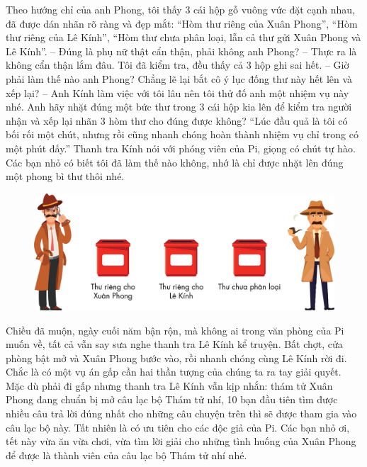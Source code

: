 	\vskip 0.1cm
	Theo hướng chỉ của anh Phong, tôi thấy $3$ cái hộp gỗ vuông vức đặt cạnh nhau, đã được dán nhãn rõ ràng và đẹp mắt: “Hòm thư riêng của Xuân Phong”, “Hòm thư riêng của Lê Kính”, “Hòm thư chưa phân loại, lẫn cả thư gửi Xuân Phong và Lê Kính”. 
	\vskip 0.1cm
	-- Đúng là phụ nữ thật cẩn thận, phải không anh Phong? 
	\vskip 0.1cm
	-- Thực ra là không cẩn thận lắm đâu. Tôi đã kiểm tra, đều thấy cả $3$ hộp ghi sai hết. 
	\vskip 0.1cm
	-- Giờ phải làm thế nào anh Phong? Chẳng lẽ lại bắt cô ý lục đống thư này hết lên và xếp lại? 
	\vskip 0.1cm
	-- Anh Kính làm việc với tôi lâu nên tôi thử đố anh một nhiệm vụ này nhé. Anh hãy nhặt đúng một bức thư trong $3$ cái hộp kia lên để kiểm tra người nhận và xếp lại nhãn $3$ hòm thư cho đúng được không? 
	\vskip 0.1cm
	“Lúc đầu quả là tôi có bối rối một chút, nhưng rồi cũng nhanh chóng hoàn thành nhiệm vụ chỉ trong có một phút đấy.” Thanh tra Kính nói với phóng viên của Pi, giọng có chút tự hào.
	\vskip 0.1cm
	Các bạn nhỏ có biết tôi đã làm thế nào không, nhớ là chỉ được nhặt lên đúng một phong bì thư thôi nhé.
		\begin{figure}[H]
			\centering
			\vspace*{-5pt}
			\captionsetup{labelformat= empty, justification=centering}
			\includegraphics[width=1\linewidth]{5}
			\vspace*{-15pt}
		\end{figure}
	Chiều đã muộn, ngày cuối năm bận rộn, mà không ai trong văn phòng của Pi muốn về, tất cả vẫn say sưa nghe thanh tra Lê Kính kể truyện. Bất chợt, cửa phòng bật mở và Xuân Phong bước vào, rồi nhanh chóng cùng Lê Kính rời đi. Chắc là có một vụ án gấp cần hai thần tượng của chúng ta ra tay giải quyết. Mặc dù phải đi gấp nhưng thanh tra Lê Kính vẫn kịp nhắn: thám tử Xuân Phong đang chuẩn bị mở câu lạc bộ Thám tử nhí, 10 bạn đầu tiên tìm được nhiều câu trả lời đúng nhất cho những câu chuyện trên thì sẽ được tham gia vào câu lạc bộ này. Tất nhiên là có ưu tiên cho các độc giả của Pi. Các bạn nhỏ ơi, tết này vừa ăn vừa chơi, vừa tìm lời giải cho những tình huống của Xuân Phong để được là thành viên của câu lạc bộ Thám tử nhí nhé.
	